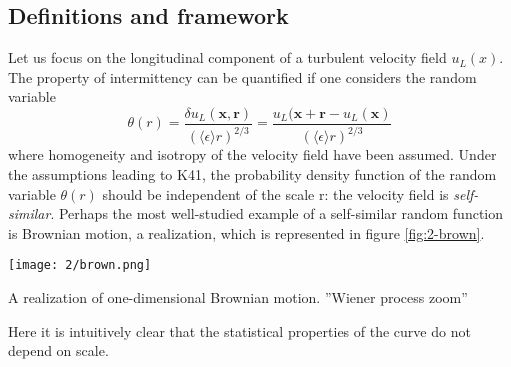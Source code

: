 \subsection{Definitions and framework}

Let us focus on the longitudinal component of a turbulent velocity field $u_L(x)$. The property of intermittency can be quantified if one considers the random variable
\begin{equation}
    \theta(r)=\frac{\delta u_L(\mathbf{x},\mathbf{r})}{(\langle\epsilon\rangle r)^{2/3}}=\frac{u_L(\mathbf{x}+\mathbf{r}-u_L(\mathbf{x})}{(\langle\epsilon\rangle r)^{2/3}}
\end{equation}
where homogeneity and isotropy of the velocity field have been assumed. Under the assumptions leading to K41, the probability density function of the random variable $\theta(r)$ should be independent of the scale r: the velocity field is \emph{self-similar}. Perhaps the most well-studied example of a self-similar random function is Brownian motion, a realization, which is represented in figure \ref{fig:2-brown}.
\begin{marginfigure}[-10cm]
\texttt{[image: 2/brown.png]}
\caption{A realization of one-dimensional Brownian motion. ”Wiener process zoom”}
\label{fig:2-brown}
\end{marginfigure}Here it is intuitively clear that the statistical properties of the curve do not depend on scale.

